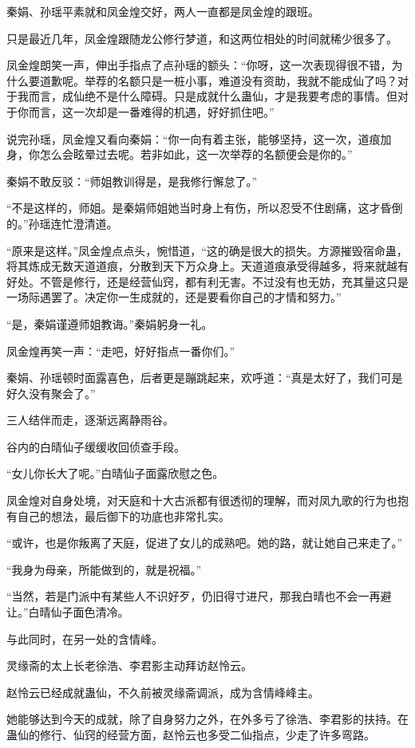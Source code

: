 \begin{this_body}
秦娟、孙瑶平素就和凤金煌交好，两人一直都是凤金煌的跟班。

只是最近几年，凤金煌跟随龙公修行梦道，和这两位相处的时间就稀少很多了。

凤金煌朗笑一声，伸出手指点了点孙瑶的额头：“你呀，这一次表现得很不错，为什么要道歉呢。举荐的名额只是一桩小事，难道没有资助，我就不能成仙了吗？对于我而言，成仙绝不是什么障碍。只是成就什么蛊仙，才是我要考虑的事情。但对于你而言，这一次却是一番难得的机遇，好好抓住吧。”

说完孙瑶，凤金煌又看向秦娟：“你一向有着主张，能够坚持，这一次，道痕加身，你怎么会眩晕过去呢。若非如此，这一次举荐的名额便会是你的。”

秦娟不敢反驳：“师姐教训得是，是我修行懈怠了。”

“不是这样的，师姐。是秦娟师姐她当时身上有伤，所以忍受不住剧痛，这才昏倒的。”孙瑶连忙澄清道。

“原来是这样。”凤金煌点点头，惋惜道，“这的确是很大的损失。方源摧毁宿命蛊，将其炼成无数天道道痕，分散到天下万众身上。天道道痕承受得越多，将来就越有好处。不管是修行，还是经营仙窍，都有利无害。不过没有也无妨，充其量这只是一场际遇罢了。决定你一生成就的，还是要看你自己的才情和努力。”

“是，秦娟谨遵师姐教诲。”秦娟躬身一礼。

凤金煌再笑一声：“走吧，好好指点一番你们。”

秦娟、孙瑶顿时面露喜色，后者更是蹦跳起来，欢呼道：“真是太好了，我们可是好久没有聚会了。”

三人结伴而走，逐渐远离静雨谷。

谷内的白晴仙子缓缓收回侦查手段。

“女儿你长大了呢。”白晴仙子面露欣慰之色。

凤金煌对自身处境，对天庭和十大古派都有很透彻的理解，而对凤九歌的行为也抱有自己的想法，最后御下的功底也非常扎实。

“或许，也是你叛离了天庭，促进了女儿的成熟吧。她的路，就让她自己来走了。”

“我身为母亲，所能做到的，就是祝福。”

“当然，若是门派中有某些人不识好歹，仍旧得寸进尺，那我白晴也不会一再避让。”白晴仙子面色清冷。

与此同时，在另一处的含情峰。

灵缘斋的太上长老徐浩、李君影主动拜访赵怜云。

赵怜云已经成就蛊仙，不久前被灵缘斋调派，成为含情峰峰主。

她能够达到今天的成就，除了自身努力之外，在外多亏了徐浩、李君影的扶持。在蛊仙的修行、仙窍的经营方面，赵怜云也多受二仙指点，少走了许多弯路。


\end{this_body}
